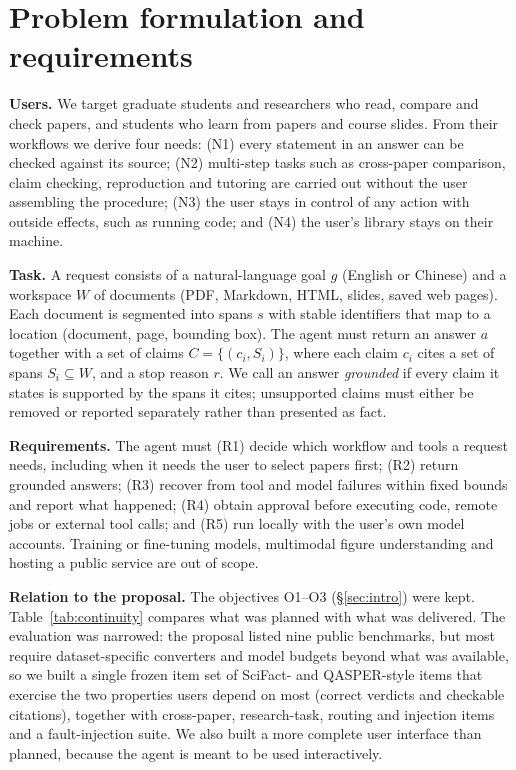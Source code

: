 \documentclass{article}
\begin{document}
\section{Problem formulation and requirements}
\label{sec:problem}

\textbf{Users.} We target graduate students and researchers who read, compare and check papers, and students who learn from papers and course slides. From their workflows we derive four needs: (N1) every statement in an answer can be checked against its source; (N2) multi-step tasks such as cross-paper comparison, claim checking, reproduction and tutoring are carried out without the user assembling the procedure; (N3) the user stays in control of any action with outside effects, such as running code; and (N4) the user's library stays on their machine.

\textbf{Task.} A request consists of a natural-language goal $g$ (English or Chinese) and a workspace $W$ of documents (PDF, Markdown, HTML, slides, saved web pages). Each document is segmented into spans $s$ with stable identifiers that map to a location (document, page, bounding box). The agent must return an answer $a$ together with a set of claims $C=\{(c_i, S_i)\}$, where each claim $c_i$ cites a set of spans $S_i \subseteq W$, and a stop reason $r$. We call an answer \emph{grounded} if every claim it states is supported by the spans it cites; unsupported claims must either be removed or reported separately rather than presented as fact.

\textbf{Requirements.} The agent must (R1) decide which workflow and tools a request needs, including when it needs the user to select papers first; (R2) return grounded answers; (R3) recover from tool and model failures within fixed bounds and report what happened; (R4) obtain approval before executing code, remote jobs or external tool calls; and (R5) run locally with the user's own model accounts. Training or fine-tuning models, multimodal figure understanding and hosting a public service are out of scope.

\textbf{Relation to the proposal.} The objectives O1--O3 (\S\ref{sec:intro}) were kept. Table~\ref{tab:continuity} compares what was planned with what was delivered. The evaluation was narrowed: the proposal listed nine public benchmarks, but most require dataset-specific converters and model budgets beyond what was available, so we built a single frozen item set of SciFact- and QASPER-style items that exercise the two properties users depend on most (correct verdicts and checkable citations), together with cross-paper, research-task, routing and injection items and a fault-injection suite. We also built a more complete user interface than planned, because the agent is meant to be used interactively.
\end{document}
